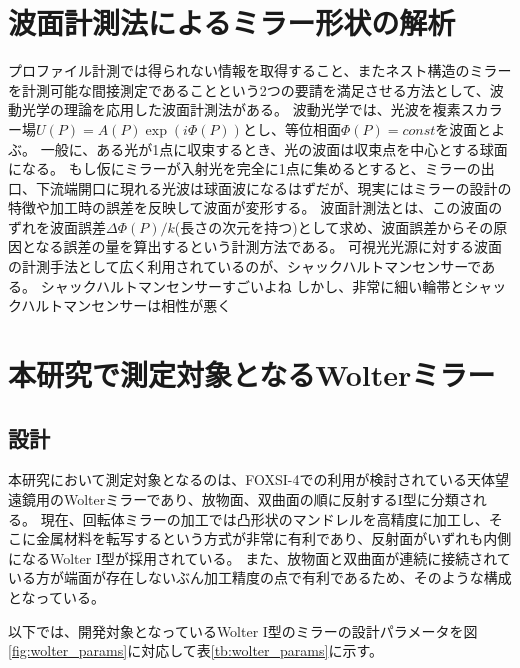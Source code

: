 \clearpage
\newpage
\section{波面計測法によるミラー形状の解析}
\label{chap1_method_for_mirror_metric}

プロファイル計測では得られない情報を取得すること、またネスト構造のミラーを計測可能な間接測定であることという2つの要請を満足させる方法として、波動光学の理論を応用した波面計測法がある。
波動光学では、光波を複素スカラー場$U(P)=A(P)\exp(i\Phi(P))$とし、等位相面$\Phi(P)=const$を波面とよぶ。
一般に、ある光が1点に収束するとき、光の波面は収束点を中心とする球面になる。
もし仮にミラーが入射光を完全に1点に集めるとすると、ミラーの出口、下流端開口に現れる光波は球面波になるはずだが、現実にはミラーの設計の特徴や加工時の誤差を反映して波面が変形する。
波面計測法とは、この波面のずれを波面誤差$\Delta\Phi(P)/k$(長さの次元を持つ)として求め、波面誤差からその原因となる誤差の量を算出するという計測方法である。
可視光光源に対する波面の計測手法として広く利用されているのが、シャックハルトマンセンサーである。
シャックハルトマンセンサーすごいよね
しかし、非常に細い輪帯とシャックハルトマンセンサーは相性が悪く


\clearpage
\newpage

\section{本研究で測定対象となるWolterミラー}
\label{chap1_target_wolter}

\subsection{設計}
\label{chap1_wolter_arrangement}
本研究において測定対象となるのは、FOXSI-4での利用が検討されている天体望遠鏡用のWolterミラーであり、放物面、双曲面の順に反射するI型に分類される。
現在、回転体ミラーの加工では凸形状のマンドレルを高精度に加工し、そこに金属材料を転写するという方式が非常に有利であり、反射面がいずれも内側になるWolter I型が採用されている。
また、放物面と双曲面が連続に接続されている方が端面が存在しないぶん加工精度の点で有利であるため、そのような構成となっている。

以下では、開発対象となっているWolter I型のミラーの設計パラメータを図\ref{fig:wolter_params}に対応して表\ref{tb:wolter_params}に示す。

